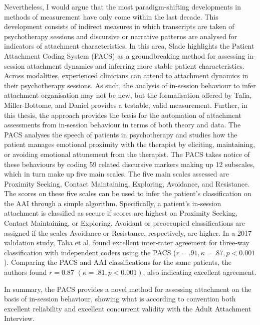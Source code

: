\documentclass[12pt]{report}
\begin{document}
Nevertheless, I would argue that the most paradigm-shifting developments in methods of measurement have only come within the last decade.
This development consists of indirect measures in which transcripts are taken of psychotherapy sessions and discursive or narrative patterns are analysed for indicators of attachment characteristics.
In this area, Slade \cite{Slade2016} highlights the Patient Attachment Coding System (PACS) as a groundbreaking method for assessing in-session attachment dynamics and inferring more stable patient characteristics.
Across modalities, experienced clinicians can attend to attachment dynamics in their psychotherapy sessions.
As such, the analysis of in-session behaviour to infer attachment organisation may not be new, but the formalisation offered by Talia, Miller-Bottome, and Daniel \cite{Talia2017, Talia2014} provides a testable, valid measurement. Further, in this thesis, the approach provides the basis for the automation of attachment assessments from in-session behaviour in terms of both theory and data.
The PACS analyses the speech of patients in psychotherapy and studies how the patient manages emotional proximity with the therapist by eliciting, maintaining, or avoiding emotional attunement from the therapist.
The PACS takes notice of these behaviours by coding 59 related discursive markers making up 12 subscales, which in turn make up five main scales.
The five main scales assessed are Proximity Seeking, Contact Maintaining, Exploring, Avoidance, and Resistance.
The scores on these five scales can be used to infer the patient's classification on the AAI through a simple algorithm.
Specifically, a patient's in-session attachment is classified as secure if scores are highest on Proximity Seeking, Contact Maintaining, or Exploring. Avoidant or preoccupied classifications are assigned if the scales Avoidance or Resistance, respectively, are higher.
In a 2017 validation study, Talia et al. \cite{Talia2017} found excellent inter-rater agreement for three-way classification with independent coders using the PACS ($r=.91, \kappa = .87, p<0.001$).
Comparing the PACS and AAI classifications for the same patients, the authors found $r=0.87$ $(\kappa = .81, p<0.001)$, also indicating excellent agreement.

In summary, the PACS provides a novel method for assessing attachment on the basis of in-session behaviour, showing what is according to convention \cite{Cicchetti1994} both excellent reliability and excellent concurrent validity with the Adult Attachment Interview.
\end{document}
